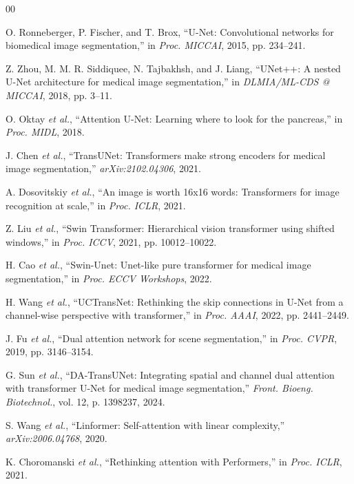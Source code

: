 \documentclass[conference]{IEEEtran}
\begin{document}
\begin{thebibliography}{00}

O. Ronneberger, P. Fischer, and T. Brox, ``U-Net: Convolutional networks for biomedical image segmentation,'' in \textit{Proc. MICCAI}, 2015, pp. 234--241.

Z. Zhou, M. M. R. Siddiquee, N. Tajbakhsh, and J. Liang, ``UNet++: A nested U-Net architecture for medical image segmentation,'' in \textit{DLMIA/ML-CDS @ MICCAI}, 2018, pp. 3--11.

O. Oktay \textit{et al.}, ``Attention U-Net: Learning where to look for the pancreas,'' in \textit{Proc. MIDL}, 2018.

J. Chen \textit{et al.}, ``TransUNet: Transformers make strong encoders for medical image segmentation,'' \textit{arXiv:2102.04306}, 2021.

A. Dosovitskiy \textit{et al.}, ``An image is worth 16x16 words: Transformers for image recognition at scale,'' in \textit{Proc. ICLR}, 2021.

Z. Liu \textit{et al.}, ``Swin Transformer: Hierarchical vision transformer using shifted windows,'' in \textit{Proc. ICCV}, 2021, pp. 10012--10022.

H. Cao \textit{et al.}, ``Swin-Unet: Unet-like pure transformer for medical image segmentation,'' in \textit{Proc. ECCV Workshops}, 2022.

H. Wang \textit{et al.}, ``UCTransNet: Rethinking the skip connections in U-Net from a channel-wise perspective with transformer,'' in \textit{Proc. AAAI}, 2022, pp. 2441--2449.

J. Fu \textit{et al.}, ``Dual attention network for scene segmentation,'' in \textit{Proc. CVPR}, 2019, pp. 3146--3154.

G. Sun \textit{et al.}, ``DA-TransUNet: Integrating spatial and channel dual attention with transformer U-Net for medical image segmentation,'' \textit{Front. Bioeng. Biotechnol.}, vol. 12, p. 1398237, 2024.

S. Wang \textit{et al.}, ``Linformer: Self-attention with linear complexity,'' \textit{arXiv:2006.04768}, 2020.

K. Choromanski \textit{et al.}, ``Rethinking attention with Performers,'' in \textit{Proc. ICLR}, 2021.


\end{thebibliography}
\end{document}

